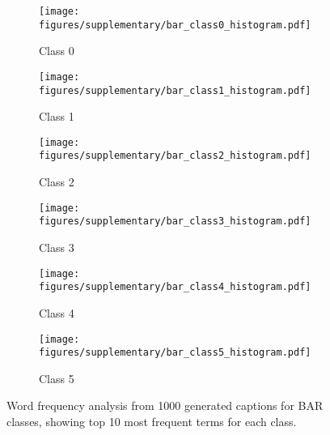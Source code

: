 \begin{figure}[htbp]
    \centering
    \begin{subfigure}[b]{0.45\columnwidth}
        \centering
        \texttt{[image: figures/supplementary/bar\_class0\_histogram.pdf]}
        \caption{Class 0}
    \end{subfigure}
    \hfill
    \begin{subfigure}[b]{0.45\columnwidth}
        \centering
        \texttt{[image: figures/supplementary/bar\_class1\_histogram.pdf]}
        \caption{Class 1}
    \end{subfigure}
    
    \vspace{0.5em}

    \begin{subfigure}[b]{0.45\columnwidth}
        \centering
        \texttt{[image: figures/supplementary/bar\_class2\_histogram.pdf]}
        \caption{Class 2}
    \end{subfigure}
    \hfill
    \begin{subfigure}[b]{0.45\columnwidth}
        \centering
        \texttt{[image: figures/supplementary/bar\_class3\_histogram.pdf]}
        \caption{Class 3}
    \end{subfigure}
    
    \vspace{0.5em}

    \begin{subfigure}[b]{0.45\columnwidth}
        \centering
        \texttt{[image: figures/supplementary/bar\_class4\_histogram.pdf]}
        \caption{Class 4}
    \end{subfigure}
    \hfill
    \begin{subfigure}[b]{0.45\columnwidth}
        \centering
        \texttt{[image: figures/supplementary/bar\_class5\_histogram.pdf]}
        \caption{Class 5}
    \end{subfigure}

    \caption{Word frequency analysis from 1000 generated captions for BAR classes, showing top 10 most frequent terms for each class.}
    \label{fig:bar_histograms}
\end{figure}

